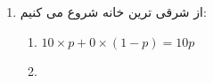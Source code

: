 \begin{enumerate}
    \item از شرقی ترین خانه شروع می کنیم:
    \begin{enumerate}
        \item $10 \times p + 0 \times (1 - p) = 10p$
        \item 
    \end{enumerate}
\end{enumerate}


